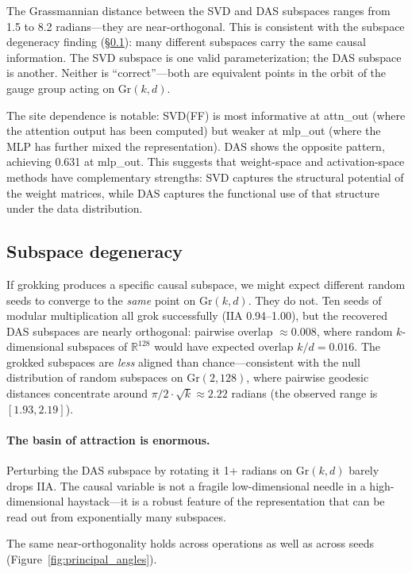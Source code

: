 \documentclass{article}
\newcommand{\Gr}{\mathrm{Gr}}
\newcommand{\IIA}{\mathrm{IIA}}
\newcommand{\R}{\mathbb{R}}
\begin{document}
The Grassmannian distance between the SVD and DAS subspaces ranges from
1.5 to 8.2 radians---they are near-orthogonal. This is consistent with
the subspace degeneracy finding (\S\ref{sec:gauge_freedom}): many different
subspaces carry the same causal information. The SVD subspace is one
valid parameterization; the DAS subspace is another. Neither is
``correct''---both are equivalent points in the orbit of the gauge
group acting on $\Gr(k,d)$.

The site dependence is notable: SVD(FF) is most informative at attn\_out
(where the attention output has been computed) but weaker at mlp\_out
(where the MLP has further mixed the representation). DAS shows the
opposite pattern, achieving 0.631 at mlp\_out. This suggests that
weight-space and activation-space methods have complementary strengths:
SVD captures the structural potential of the weight matrices, while DAS
captures the functional use of that structure under the data distribution.

\subsection{Subspace degeneracy}
\label{sec:gauge_freedom}

If grokking produces a specific causal subspace, we might expect different
random seeds to converge to the \emph{same} point on $\Gr(k,d)$. They do
not. Ten seeds of modular multiplication all grok successfully ($\IIA$
0.94--1.00), but the recovered DAS subspaces are nearly orthogonal: pairwise
overlap $\approx 0.008$, where random $k$-dimensional subspaces of
$\R^{128}$ would have expected overlap $k/d = 0.016$. The grokked subspaces
are \emph{less} aligned than chance---consistent with the null distribution
of random subspaces on $\Gr(2, 128)$, where pairwise geodesic distances
concentrate around $\pi/2 \cdot \sqrt{k} \approx 2.22$ radians (the
observed range is $[1.93, 2.19]$).

\paragraph{The basin of attraction is enormous.}
Perturbing the DAS subspace by rotating it 1+ radians on $\Gr(k,d)$
barely drops IIA. The causal variable is not a fragile low-dimensional
needle in a high-dimensional haystack---it is a robust feature of the
representation that can be read out from exponentially many subspaces.

The same near-orthogonality holds across operations as well as across seeds
(Figure~\ref{fig:principal_angles}).
\end{document}
